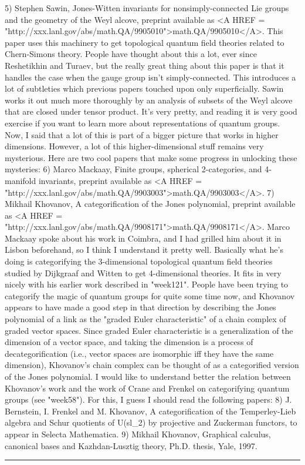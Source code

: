 5) Stephen Sawin, Jones-Witten invariants for nonsimply-connected
Lie groups and the geometry of the Weyl alcove, preprint available
as <A HREF = "http://xxx.lanl.gov/abs/math.QA/9905010">math.QA/9905010</A>.
This paper uses this machinery to get topological quantum field
theories related to Chern-Simons theory.   People have thought about 
this a lot, ever since Reshetikhin and Turaev, but the really
great thing about this paper is that it handles the case when
the gauge group isn't simply-connected.  This introduces a lot
of subtleties which previous papers touched upon only superficially.
Sawin works it out much more thoroughly by an analysis of subsets
of the Weyl alcove that are closed under tensor product.  It's
very pretty, and reading it is very good exercise if you want to
learn more about representations of quantum groups.
Now, I said that a lot of this is part of a bigger picture that
works in higher dimensions.  However, a lot of this higher-dimensional
stuff remains very mysterious.  Here are two cool papers that make
some progress in unlocking these mysteries:
6) Marco Mackaay, Finite groups, spherical 2-categories, and 4-manifold
invariants, preprint available as 
<A HREF = "http://xxx.lanl.gov/abs/math.QA/9903003">math.QA/9903003</A>.
7) Mikhail Khovanov, A categorification of the Jones polynomial, 
preprint available as <A HREF = "http://xxx.lanl.gov/abs/math.QA/9908171">math.QA/9908171</A>.
Marco Mackaay spoke about his work in Coimbra, and I had grilled
him about it in Lisbon beforehand, so I think I understand it 
pretty well.  Basically what he's doing is categorifying the 
3-dimensional topological quantum field theories studied by Dijkgraaf 
and Witten to get 4-dimensional theories.  It fits in very nicely 
with his earlier work described in "week121".  
People have been trying to categorify the magic of quantum groups
for quite some time now, and Khovanov appears to have made a good
step in that direction by describing the Jones polynomial of a
link as the "graded Euler characteristic" of a chain complex of
graded vector spaces.  Since graded Euler characteristic is a
generalization of the dimension of a vector space, and taking the
dimension is a process of decategorification (i.e., vector spaces
are isomorphic iff they have the same dimension), Khovanov's 
chain complex can be thought of as a categorified version of the
Jones polynomial.  
I would like to understand better the relation between Khovanov's
work and the work of Crane and Frenkel on categorifying quantum
groups (see "week58").  For this, I guess I should read the 
following papers:
8) J. Bernstein, I. Frenkel and M. Khovanov, A categorification
of the Temperley-Lieb algebra and Schur quotients of U(sl_2)
by projective and Zuckerman functors, to appear in Selecta
Mathematica.
9) Mikhail Khovanov, Graphical calculus, canonical bases and
Kazhdan-Lusztig theory, Ph.D. thesis, Yale, 1997.


 \par\noindent\rule{\textwidth}{0.4pt}

